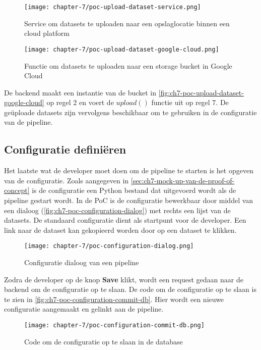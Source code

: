 \begin{figure}[hbt!]
  \centering
  \texttt{[image: chapter-7/poc-upload-dataset-service.png]}
  \caption{Service om datasets te uploaden naar een opslaglocatie binnen een cloud platform}
  \label{fig:ch7-poc-upload-dataset-service}
\end{figure}

\begin{figure}[hbt!]
  \centering
  \texttt{[image: chapter-7/poc-upload-dataset-google-cloud.png]}
  \caption{Functie om datasets te uploaden naar een storage bucket in Google Cloud}
  \label{fig:ch7-poc-upload-dataset-google-cloud}
\end{figure}

De backend maakt een instantie van de bucket in \autoref{fig:ch7-poc-upload-dataset-google-cloud} op regel 2 en voert de \(upload()\) functie uit op regel 7. De geüploade datasets zijn vervolgens beschikbaar om te gebruiken in de configuratie van de pipeline.

\subsection{Configuratie definiëren}\label{subsec:ch7-configuratie-definieren}
Het laatste wat de developer moet doen om de pipeline te starten is het opgeven van de configuratie. Zoals aangegeven in \autoref{sec:ch7-mock-up-van-de-proof-of-concept} is de configuratie een Python bestand dat uitgevoerd wordt als de pipeline gestart wordt. In de PoC is de configuratie bewerkbaar door middel van een dialoog (\autoref{fig:ch7-poc-configuration-dialog}) met rechts een lijst van de datasets. De standaard configuratie dient als startpunt voor de developer. Een link naar de dataset kan gekopieerd worden door op een dataset te klikken.

\begin{figure}[hbt!]
  \centering
  \texttt{[image: chapter-7/poc-configuration-dialog.png]}
  \caption{Configuratie dialoog van een pipeline}
  \label{fig:ch7-poc-configuration-dialog}
\end{figure}

Zodra de developer op de knop \textbf{Save} klikt, wordt een request gedaan naar de backend om de configuratie op te slaan. De code om de configuratie op te slaan is te zien in \autoref{fig:ch7-poc-configuration-commit-db}. Hier wordt een nieuwe configuratie aangemaakt en gelinkt aan de pipeline.

\begin{figure}[hbt!]
  \centering
  \texttt{[image: chapter-7/poc-configuration-commit-db.png]}
  \caption{Code om de configuratie op te slaan in de database}
  \label{fig:ch7-poc-configuration-commit-db}
\end{figure}

